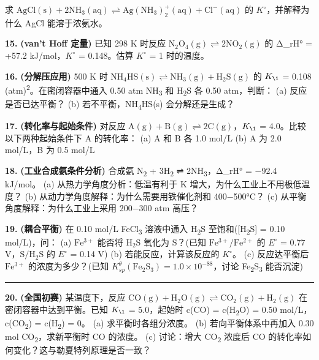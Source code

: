 求 \(\mathrm{AgCl(s) + 2NH_3(aq) \rightleftharpoons Ag(NH_3)_2^+(aq) + Cl^-(aq)}\) 的 \(K^{\circ}\)，并解释为什么 AgCl 能溶于浓氨水。

\textbf{15.} \textbf{(van't Hoff 定量)} 已知 298 K 时反应 \(\mathrm{N_2O_4(g) \rightleftharpoons 2NO_2(g)}\) 的 Δ\_rH° = +57.2 kJ/mol，\(K^{\circ}\) = 0.148。估算 \(K^{\circ}\) = 1 时的温度。

\textbf{16.} \textbf{(分解压应用)} 500 K 时 \(\mathrm{NH_4HS(s) \rightleftharpoons NH_3(g) + H_2S(g)}\) 的 \(K_{\1}\) = 0.108 (atm)\textsuperscript{2}。在密闭容器中通入 0.50 atm NH\textsubscript{3} 和 H\textsubscript{2}S 各 0.50 atm，判断：
(a) 反应是否已达平衡？
(b) 若不平衡，NH\textsubscript{4}HS(s) 会分解还是生成？

\textbf{17.} \textbf{(转化率与起始条件)} 对反应 \(\mathrm{A(g) + B(g) \rightleftharpoons 2C(g)}\)，\(K_{\1}\) = 4.0。比较以下两种起始条件下 A 的转化率：
(a) A 和 B 各 1.0 mol/L
(b) A 为 2.0 mol/L，B 为 0.5 mol/L

\textbf{18.} \textbf{(工业合成氨条件分析)} 合成氨 N\textsubscript{2} + 3H\textsubscript{2} ⇌ 2NH\textsubscript{3}，Δ\_rH° = −92.4 kJ/mol。
(a) 从热力学角度分析：低温有利于 K 增大，为什么工业上不用极低温度？
(b) 从动力学角度解释：为什么需要用铁催化剂和 400−500°C？
(c) 从平衡角度解释：为什么工业上采用 200−300 atm 高压？

\textbf{19.} \textbf{(耦合平衡)} 在 0.10 mol/L FeCl\textsubscript{3} 溶液中通入 H\textsubscript{2}S 至饱和({[}H\textsubscript{2}S{]} = 0.10 mol/L)，问：
(a) \(\mathrm{Fe^{3+}}\) 能否将 \(\mathrm{H_2S}\) 氧化为 \(\mathrm{S}\)？(已知 \(\mathrm{Fe^{3+}/Fe^{2+}}\) 的 \(E^{\circ}\) = 0.77 V，\(\mathrm{S/H_2S}\) 的 \(E^{\circ}\) = 0.14 V)
(b) 若能反应，计算该反应的 \(K^{\circ}\)。
(c) 反应达平衡后 \(\mathrm{Fe^{3+}}\) 的浓度为多少？(已知 \(K_{sp}^\theta(\mathrm{Fe_2S_3}) = 1.0 \times 10^{-88}\)，讨论 Fe\textsubscript{2}S\textsubscript{3} 能否沉淀)

\begin{center}\rule{0.5\linewidth}{0.5pt}\end{center}

\textbf{20.} \textbf{(全国初赛)} 某温度下，反应 \(\mathrm{CO(g) + H_2O(g) \rightleftharpoons CO_2(g) + H_2(g)}\) 在密闭容器中达到平衡。已知 \(K_{\1}\) = 5.0，起始时 c(CO) = c(H\textsubscript{2}O) = 0.50 mol/L，c(CO\textsubscript{2}) = c(H\textsubscript{2}) = 0。
(a) 求平衡时各组分浓度。
(b) 若向平衡体系中再加入 0.30 mol CO\textsubscript{2}，求新平衡时 CO 的浓度。
(c) 讨论：增大 CO\textsubscript{2} 浓度后 CO 的转化率如何变化？这与勒夏特列原理是否一致？

